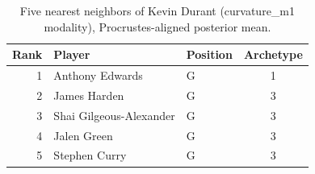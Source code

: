 \begin{table}[htbp]
  \centering\small
  \begin{tabular}{rllc}
    \toprule
    Rank & Player & Position & Archetype \\
    \midrule
    1 & Anthony Edwards & G & 1 \\
    2 & James Harden & G & 3 \\
    3 & Shai Gilgeous-Alexander & G & 3 \\
    4 & Jalen Green & G & 3 \\
    5 & Stephen Curry & G & 3 \\
    \bottomrule
  \end{tabular}
  \caption{Five nearest neighbors of Kevin Durant (curvature_m1 modality), Procrustes-aligned posterior mean.}
  \label{tab:Kevin_Durant_neighbors_curvature_m1}
\end{table}

